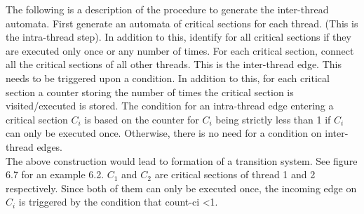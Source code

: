 The following is a description of the procedure to generate the inter-thread automata. First generate an automata of critical sections for each thread. (This is the intra-thread step). In addition to this, identify for all critical sections if they are executed only once or any number of times. For each critical section, connect all the critical sections of all other threads. This is the inter-thread edge. This needs to be triggered upon a condition. In addition to this, for each critical section a counter storing the number of times the critical section is visited/executed is stored. The condition for an intra-thread edge entering a critical section $C_i$ is based on the counter for $C_i$ being strictly less than 1 if $C_i$ can only be executed once. Otherwise, there is no need for a condition on inter-thread edges. \\

The above construction would lead to formation of a transition system. See figure 6.7 for an example 6.2. $C_1$ and $C_2$
are critical sections of thread 1 and 2 respectively. Since both of them can only be executed once, the incoming edge on $C_i$ is triggered by the condition that count-ci \textless 1. \\

